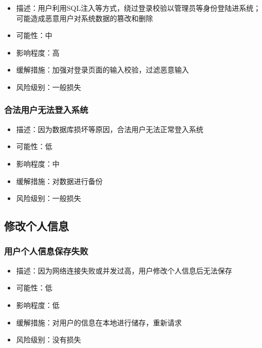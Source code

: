 \documentclass[hyperref, a4paper]{ctexart}
\providecommand{\tightlist}{%
  \setlength{\itemsep}{0pt}\setlength{\parskip}{0pt}}
\begin{document}
\begin{itemize}
\tightlist
\item
  描述：用户利用SQL注入等方式，绕过登录校验以管理员等身份登陆进系统；可能造成恶意用户对系统数据的篡改和删除
\item
  可能性：中
\item
  影响程度：高
\item
  缓解措施：加强对登录页面的输入校验，过滤恶意输入
\item
  风险级别：一般损失
\end{itemize}

\hypertarget{ux5408ux6cd5ux7528ux6237ux65e0ux6cd5ux767bux5165ux7cfbux7edf}{%
\subsubsection{合法用户无法登入系统}\label{ux5408ux6cd5ux7528ux6237ux65e0ux6cd5ux767bux5165ux7cfbux7edf}}

\begin{itemize}
\tightlist
\item
  描述：因为数据库损坏等原因，合法用户无法正常登入系统
\item
  可能性：低
\item
  影响程度：中
\item
  缓解措施：对数据进行备份
\item
  风险级别：一般损失
\end{itemize}

\hypertarget{ux4feeux6539ux4e2aux4ebaux4fe1ux606f}{%
\subsection{修改个人信息}\label{ux4feeux6539ux4e2aux4ebaux4fe1ux606f}}

\hypertarget{ux7528ux6237ux4e2aux4ebaux4fe1ux606fux4fddux5b58ux5931ux8d25}{%
\subsubsection{用户个人信息保存失败}\label{ux7528ux6237ux4e2aux4ebaux4fe1ux606fux4fddux5b58ux5931ux8d25}}

\begin{itemize}
\tightlist
\item
  描述：因为网络连接失败或并发过高，用户修改个人信息后无法保存
\item
  可能性：低
\item
  影响程度：低
\item
  缓解措施：对用户的信息在本地进行储存，重新请求
\item
  风险级别：没有损失
\end{itemize}
\end{document}
